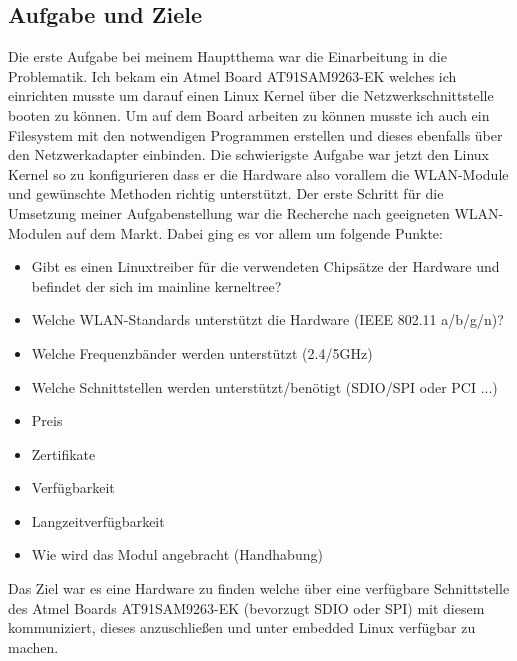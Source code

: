 \documentclass[pdftex,12pt,a4paper]{scrreprt}
\begin{document}
\subsection{Aufgabe und Ziele}
Die erste Aufgabe bei meinem Hauptthema war die Einarbeitung in die Problematik.
Ich bekam ein Atmel Board AT91SAM9263-EK welches ich einrichten musste um darauf einen Linux Kernel über die Netzwerkschnittstelle booten zu können.
Um auf dem Board arbeiten zu können musste ich auch ein Filesystem mit den notwendigen Programmen erstellen und dieses ebenfalls über den Netzwerkadapter einbinden.
Die schwierigste Aufgabe war jetzt den Linux Kernel so zu konfigurieren dass er die Hardware also vorallem die WLAN-Module und gewünschte Methoden richtig unterstützt.
Der erste Schritt für die Umsetzung meiner Aufgabenstellung war die Recherche nach geeigneten WLAN-Modulen auf dem Markt.
Dabei ging es vor allem um folgende Punkte:\\
\begin{itemize}
 \item Gibt es einen Linuxtreiber für die verwendeten Chipsätze der Hardware und befindet der sich im mainline kerneltree?
 \item Welche WLAN-Standards unterstützt die Hardware (IEEE 802.11 a/b/g/n)?
 \item Welche Frequenzbänder werden unterstützt (2.4/5GHz)
 \item Welche Schnittstellen werden unterstützt/benötigt (SDIO/SPI oder PCI ...)
 \item Preis
 \item Zertifikate
 \item Verfügbarkeit
 \item Langzeitverfügbarkeit
 \item Wie wird das Modul angebracht (Handhabung)
\end{itemize}

Das Ziel war es eine Hardware zu finden welche über eine verfügbare Schnittstelle des Atmel Boards AT91SAM9263-EK (bevorzugt SDIO oder SPI) mit diesem kommuniziert, dieses anzuschließen und unter embedded Linux verfügbar zu machen.
\end{document}

